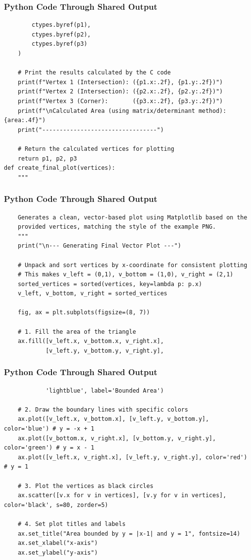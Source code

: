 \documentclass{beamer}
\begin{document}
\begin{frame}[fragile]
\frametitle{Python Code Through Shared Output }
\begin{lstlisting}
        ctypes.byref(p1),
        ctypes.byref(p2),
        ctypes.byref(p3)
    )

    # Print the results calculated by the C code
    print(f"Vertex 1 (Intersection): ({p1.x:.2f}, {p1.y:.2f})")
    print(f"Vertex 2 (Intersection): ({p2.x:.2f}, {p2.y:.2f})")
    print(f"Vertex 3 (Corner):       ({p3.x:.2f}, {p3.y:.2f})")
    print(f"\nCalculated Area (using matrix/determinant method): {area:.4f}")
    print("---------------------------------")
    
    # Return the calculated vertices for plotting
    return p1, p2, p3
def create_final_plot(vertices):
    """
    \end{lstlisting}    
\end{frame}
\begin{frame}[fragile]
\frametitle{Python Code Through Shared Output }
\begin{lstlisting}
    Generates a clean, vector-based plot using Matplotlib based on the
    provided vertices, matching the style of the example PNG.
    """
    print("\n--- Generating Final Vector Plot ---")
    
    # Unpack and sort vertices by x-coordinate for consistent plotting
    # This makes v_left = (0,1), v_bottom = (1,0), v_right = (2,1)
    sorted_vertices = sorted(vertices, key=lambda p: p.x)
    v_left, v_bottom, v_right = sorted_vertices
    
    fig, ax = plt.subplots(figsize=(8, 7))

    # 1. Fill the area of the triangle
    ax.fill([v_left.x, v_bottom.x, v_right.x], 
            [v_left.y, v_bottom.y, v_right.y],
            \end{lstlisting}    
\end{frame}
\begin{frame}[fragile]
\frametitle{Python Code Through Shared Output }
\begin{lstlisting}
            'lightblue', label='Bounded Area')

    # 2. Draw the boundary lines with specific colors
    ax.plot([v_left.x, v_bottom.x], [v_left.y, v_bottom.y], color='blue') # y = -x + 1
    ax.plot([v_bottom.x, v_right.x], [v_bottom.y, v_right.y], color='green') # y = x - 1
    ax.plot([v_left.x, v_right.x], [v_left.y, v_right.y], color='red') # y = 1
    
    # 3. Plot the vertices as black circles
    ax.scatter([v.x for v in vertices], [v.y for v in vertices], color='black', s=80, zorder=5)

    # 4. Set plot titles and labels
    ax.set_title("Area bounded by y = |x-1| and y = 1", fontsize=14)
    ax.set_xlabel("x-axis")
    ax.set_ylabel("y-axis")
\end{lstlisting}    
\end{frame}
\end{document}
